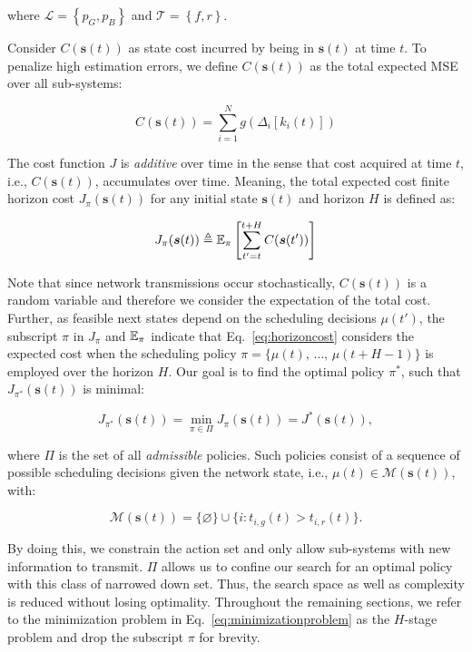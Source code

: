 where $\mathcal{L}=\left\{p_G,p_B\right\}$ and $\mathcal{T}=\left\{f,r\right\}$.

Consider $C(\boldsymbol{s}(t))$ as state cost incurred by being in
$\boldsymbol{s}(t)$ at time $t$. To penalize high estimation errors, we define
$C(\boldsymbol{s}(t))$ as the total expected MSE over all sub-systems:

\begin{equation}
  \label{eq:gfunction}
  C(\boldsymbol{s}(t)) =  \sum_{i=1}^{N}  g(\Delta_i[k_i(t)])
\end{equation}

The cost function $J$ is \textit{additive} over time in the sense that cost
acquired at time $t$, i.e., $C(\boldsymbol{s}(t))$, accumulates over time.
Meaning, the total expected cost finite horizon cost $J_{\pi}(\boldsymbol{s}
(t))$ for any initial state $\boldsymbol{s}(t)$ and horizon $H$ is defined as:

\begin{equation}
  \label{eq:horizoncost}	
  J_\pi(\boldsymbol{s}(t)) \triangleq \mathbb{E}_\pi \left[ \sum_{t' = t }^{t + H} C(\boldsymbol{s}(t')) \right] 
\end{equation}

Note that since network transmissions occur stochastically,
$C(\boldsymbol{s}(t))$ is a random variable and therefore we consider the
expectation of the total cost. Further, as feasible next states depend on the
scheduling decisions $\mu(t')$, the subscript $\pi$ in $J_\pi$ and $\mathbb{E}_\pi$
indicate that Eq.~\eqref{eq:horizoncost} considers the expected cost when the
scheduling policy $\pi = \{ \mu(t), \, \dots, \, \mu(t + H-1) \}$ is employed
over the horizon $H$. Our goal is to find the optimal
policy $\pi^*$, such that $J_{\pi^*}(\boldsymbol{s}(t))$ is minimal:

\begin{equation}
\label{eq:minimizationproblem}
	J_{\pi^*}(\boldsymbol{s}(t)) = \min_{\pi \in \Pi} J_\pi (\boldsymbol{s}(t)) = J^*(\boldsymbol{s}(t)),
\end{equation}

where $\Pi$ is the set of all \textit{admissible} policies. Such policies
consist of a sequence of possible scheduling decisions given the network state,
i.e., $\mu(t) \in \mathcal{M}(\boldsymbol{s}(t))$, with:

\begin{equation}
  \label{eq:admissibleactions}
  \mathcal{M}(\boldsymbol{s}(t)) = \{\varnothing\} \cup \{i : t_{i,g}(t) > t_{i,r}(t) \}.
\end{equation}

By doing this, we constrain the action set and only allow sub-systems with new
information to transmit. $\Pi$ allows us to confine our search for an optimal
policy with this class of narrowed down set. Thus, the search space as well as
complexity is reduced without losing optimality. Throughout the remaining
sections, we refer to the minimization problem in
Eq.~\eqref{eq:minimizationproblem} as the $H$-stage problem and drop the
subscript $\pi$ for brevity.
